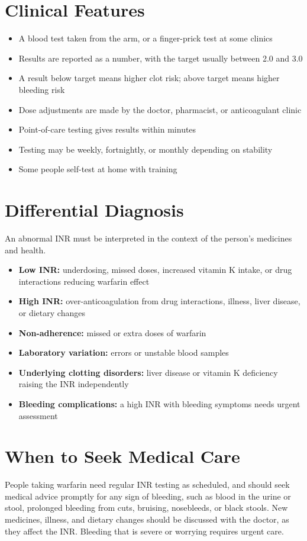 \section*{Clinical Features}
\begin{itemize}
    \item A blood test taken from the arm, or a finger-prick test at some clinics
    \item Results are reported as a number, with the target usually between 2.0 and 3.0
    \item A result below target means higher clot risk; above target means higher bleeding risk
    \item Dose adjustments are made by the doctor, pharmacist, or anticoagulant clinic
    \item Point-of-care testing gives results within minutes
    \item Testing may be weekly, fortnightly, or monthly depending on stability
    \item Some people self-test at home with training
\end{itemize}

\section*{Differential Diagnosis}
An abnormal INR must be interpreted in the context of the person's medicines and health.
\begin{itemize}
    \item \textbf{Low INR:} underdosing, missed doses, increased vitamin K intake, or drug interactions reducing warfarin effect
    \item \textbf{High INR:} over-anticoagulation from drug interactions, illness, liver disease, or dietary changes
    \item \textbf{Non-adherence:} missed or extra doses of warfarin
    \item \textbf{Laboratory variation:} errors or unstable blood samples
    \item \textbf{Underlying clotting disorders:} liver disease or vitamin K deficiency raising the INR independently
    \item \textbf{Bleeding complications:} a high INR with bleeding symptoms needs urgent assessment
\end{itemize}

\section*{When to Seek Medical Care}
People taking warfarin need regular INR testing as scheduled, and should seek medical advice promptly for any sign of bleeding, such as blood in the urine or stool, prolonged bleeding from cuts, bruising, nosebleeds, or black stools. New medicines, illness, and dietary changes should be discussed with the doctor, as they affect the INR. Bleeding that is severe or worrying requires urgent care.

